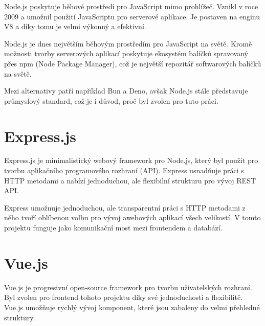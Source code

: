 Node.js poskytuje běhové prostředí pro JavaScript mimo prohlížeč. Vznikl v roce 2009 a umožnil použití JavaScriptu pro serverové aplikace. Je postaven na enginu V8 a díky tomu je velmi výkonný a efektivní.\cite{nodejsNodejsAbout}

Node.js je dnes největším běhovým prostředím pro JavaScript na světě. Kromě možnosti tvorby serverových aplikací poskytuje ekosystém balíčků spravovaný přes npm (Node Package Manager), což je největší repozitář softwarových balíčků na světě.\cite{npmjsAboutDocs}

Mezi alternativy patří například Bun a Deno, avšak Node.js stále představuje průmyslový standard, což je i důvod, proč byl zvolen pro tuto práci.

\section{Express.js}
Express.js je minimalistický webový framework pro Node.js, který byl použit pro tvorbu aplikačního programového rozhraní (API). Express usnadňuje práci s HTTP metodami a nabízí jednoduchou, ale flexibilní strukturu pro vývoj REST API\cite{expressjsExpressNodejs}.

Express umožnuje jednoduchou, ale transparentní práci s HTTP metodami z něho tvoří oblíbenou volbu pro vývoj awebových aplikací všech velikostí. V tomto projektu funguje jako komunikační most mezi frontendem a databází.

\section{Vue.js}
Vue.js je progresivní open-source framework pro tvorbu uživatelských rozhraní\cite{vuejsVuejs}. Byl zvolen pro frontend tohoto projektu díky své jednoduchosti a flexibilitě. Vue.js umožňuje rychlý vývoj komponent, které jsou zabaleny do velmi přehledné struktury.

